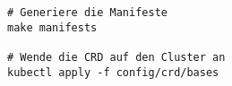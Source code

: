 \begin{verbatim}
# Generiere die Manifeste
make manifests

# Wende die CRD auf den Cluster an
kubectl apply -f config/crd/bases
\end{verbatim}